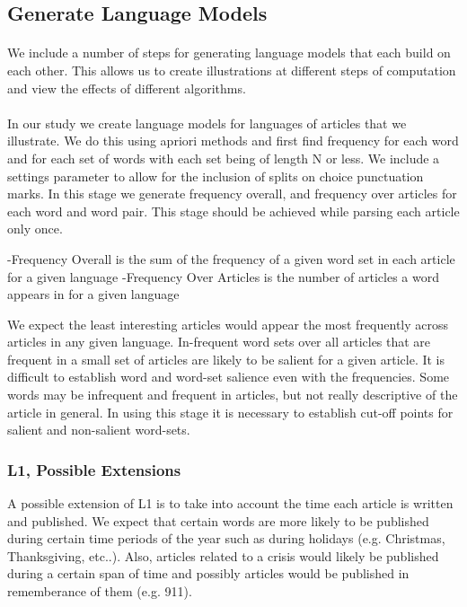\documentclass[12pt]{article}
\begin{document}
\subsection{Generate Language Models}
\paragraph{}
We include a number of steps for generating language models that each build on each other. This allows us to create illustrations at different steps of computation and view the effects of different algorithms.
\paragraph{}
In our study we create language models for languages of articles that we illustrate. We do this using apriori methods and first find frequency for each word and for each set of words with each set being of length N or less. We include a settings parameter to allow for the inclusion of splits on choice punctuation marks. In this stage we generate frequency overall, and frequency over articles for each word and word pair. This stage should be achieved while parsing each article only once.

-Frequency Overall is the sum of the frequency of a given word set in each article for a given language
-Frequency Over Articles is the number of articles a word appears in for a given language

We expect the least interesting articles would appear the most frequently across articles in any given language. In-frequent word sets over all articles that are frequent in a small set of articles are likely to be salient for a given article. It is difficult to establish word and word-set salience even with the frequencies. Some words may be infrequent and frequent in articles, but not really descriptive of the article in general. In using this stage it is necessary to establish
cut-off points for salient and non-salient word-sets.

\subsubsection{L1, Possible Extensions}
A possible extension of L1 is to take into account the time each article is written and published. We expect that certain words are more likely to be published during certain time periods of the year such as during holidays (e.g. Christmas, Thanksgiving, etc..). Also, articles related to a crisis would likely be published during a certain span of time and possibly articles would be published in rememberance of them (e.g. 911).
\end{document}
